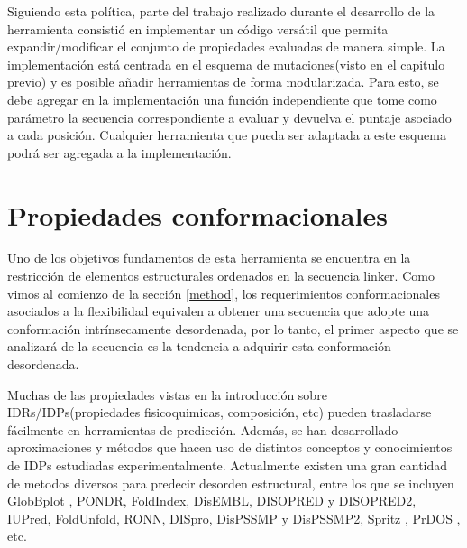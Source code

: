 % 

Siguiendo esta política, parte del trabajo realizado durante el desarrollo de la herramienta consistió en implementar un código versátil que permita expandir/modificar el conjunto de propiedades evaluadas de manera simple.
La implementación está centrada en el esquema de mutaciones(visto en el capitulo previo) y es posible añadir herramientas de forma modularizada.
Para esto, se debe agregar en la implementación una función independiente que tome como parámetro la secuencia correspondiente a evaluar y devuelva el puntaje asociado a cada posición. 
Cualquier herramienta que pueda ser adaptada a este esquema podrá ser agregada a la implementación.



\section{Propiedades conformacionales} \label{propiedadesConformacionales}

Uno de los objetivos fundamentos de esta herramienta se encuentra en la restricción de elementos estructurales ordenados en la secuencia linker.
Como vimos al comienzo de la sección \ref{method}, los requerimientos conformacionales asociados a la flexibilidad equivalen a obtener una secuencia 
que adopte una conformación intrínsecamente desordenada, por lo tanto, el primer aspecto que se analizará de la secuencia es la tendencia a adquirir esta conformación desordenada.


Muchas de las propiedades vistas en la introducción sobre IDRs/IDPs(propiedades fisicoquimicas, composición, etc) pueden trasladarse fácilmente en herramientas de predicción.
Además, se han desarrollado aproximaciones y métodos que hacen uso de distintos conceptos y conocimientos de IDPs estudiadas experimentalmente.
Actualmente existen una gran cantidad de metodos diversos para predecir desorden estructural\cite{he2009predicting}, entre los que se incluyen
GlobBplot \cite{linding2003globplot}, PONDR, FoldIndex, DisEMBL, DISOPRED y DISOPRED2, IUPred, 
FoldUnfold, RONN, DISpro, DisPSSMP y DisPSSMP2, Spritz , PrDOS , etc.

